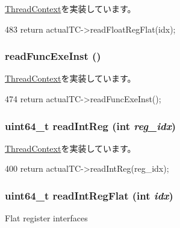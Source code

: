 \hyperlink{classThreadContext_a275e2481d9069a0ae8142fb7cc901cbf}{ThreadContext}を実装しています。


\begin{DoxyCode}
483     { return actualTC->readFloatRegFlat(idx); }
\end{DoxyCode}
\hypertarget{classProxyThreadContext_a2b0bef6e1b1ac24e9322fbd09a511d11}{
\subsubsection[{readFuncExeInst}]{ readFuncExeInst ()}}
\label{classProxyThreadContext_a2b0bef6e1b1ac24e9322fbd09a511d11}


\hyperlink{classThreadContext_ae9aa32b63846c7bae5f2b6d899bdbf9c}{ThreadContext}を実装しています。


\begin{DoxyCode}
474 { return actualTC->readFuncExeInst(); }
\end{DoxyCode}
\hypertarget{classProxyThreadContext_a21c850cd41ab977a2cf3450fe66ec25a}{
\subsubsection[{readIntReg}]{\setlength{\rightskip}{0pt plus 5cm}uint64\_\-t readIntReg (int {\em reg\_\-idx})}}
\label{classProxyThreadContext_a21c850cd41ab977a2cf3450fe66ec25a}


\hyperlink{classThreadContext_af80734776d68e6acd48e22f6c999394a}{ThreadContext}を実装しています。


\begin{DoxyCode}
400     { return actualTC->readIntReg(reg_idx); }
\end{DoxyCode}
\hypertarget{classProxyThreadContext_aed7abd4afcb954f8612e4ef1fe73317a}{
\subsubsection[{readIntRegFlat}]{\setlength{\rightskip}{0pt plus 5cm}uint64\_\-t readIntRegFlat (int {\em idx})}}
\label{classProxyThreadContext_aed7abd4afcb954f8612e4ef1fe73317a}
Flat register interfaces

